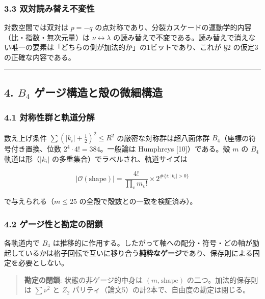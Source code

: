 \documentclass[
]{ltjsarticle}
\begin{document}
\subsubsection{3.3
双対読み替え不変性}\label{ux53ccux5bfeux8aadux307fux66ffux3048ux4e0dux5909ux6027}

対数空間では双対は \(p=-q\)
の点対称であり、分裂カスケードの運動学的内容（比・指数・無次元量）は
\(\nu\leftrightarrow\lambda\)
の読み替えで不変である。読み替えで消えない唯一の要素は「どちらの側が加法的か」の1ビットであり、これが
§2 の仮定3の正確な内容である。

\begin{center}\rule{0.5\linewidth}{0.5pt}\end{center}

\subsection{\texorpdfstring{4. \(B_4\)
ゲージ構造と殻の微細構造}{4. B\_4 ゲージ構造と殻の微細構造}}\label{b_4-ux30b2ux30fcux30b8ux69cbux9020ux3068ux6bbbux306eux5faeux7d30ux69cbux9020}

\subsubsection{4.1
対称性群と軌道分解}\label{ux5bfeux79f0ux6027ux7fa4ux3068ux8eccux9053ux5206ux89e3}

数え上げ条件 \(\sum(|k_i|+\tfrac12)^2\le R^2\)
の厳密な対称群は超八面体群 \(B_4\)（座標の符号付き置換、位数
\(2^4\cdot4!=384\)。一般論は Humphreys {[}10{]}）である。殻 \(m\) の
\(B_4\) 軌道は形（\(|k_i|\) の多重集合）でラベルされ、軌道サイズは

\[
|\mathcal{O}(\text{shape})|=\frac{4!}{\prod_v m_v!}\times 2^{\#\{i:|k_i|>0\}}
\]

で与えられる（\(m\le25\) の全殻で殻数との一致を検証済み）。

\subsubsection{4.2
ゲージ性と勘定の閉鎖}\label{ux30b2ux30fcux30b8ux6027ux3068ux52d8ux5b9aux306eux9589ux9396}

各軌道内で \(B_4\)
は推移的に作用する。したがって軸への配分・符号・どの軸が励起しているかは格子回転で互いに移り合う\textbf{純粋なゲージ}であり、保存則による固定を必要としない。

\begin{quote}
\textbf{勘定の閉鎖}: 状態の非ゲージ的中身は \((m,\text{shape})\)
の二つ。加法的保存則は \(\sum\nu^2\) と \(Z_2\)
パリティ（論文5）の計2本で、自由度の勘定は閉じる。
\end{quote}
\end{document}
